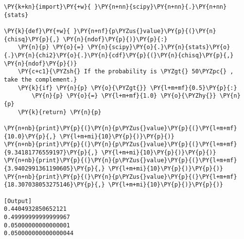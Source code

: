 \begin{Verbatim}[label=\makebox{\href{https://github.com/unipi-physics-labs/statnotes/tree/main/snippy/p_value.py}{https://github.com/.../p\_value.py}},commandchars=\\\{\}]
\PY{k+kn}{import}\PY{+w}{ }\PY{n+nn}{scipy}\PY{n+nn}{.}\PY{n+nn}{stats}

\PY{k}{def}\PY{+w}{ }\PY{n+nf}{p\PYZus{}value}\PY{p}{(}\PY{n}{chisq}\PY{p}{,} \PY{n}{ndof}\PY{p}{)}\PY{p}{:}
    \PY{n}{p} \PY{o}{=} \PY{n}{scipy}\PY{o}{.}\PY{n}{stats}\PY{o}{.}\PY{n}{chi2}\PY{o}{.}\PY{n}{cdf}\PY{p}{(}\PY{n}{chisq}\PY{p}{,} \PY{n}{ndof}\PY{p}{)}
    \PY{c+c1}{\PYZsh{} If the probability is \PYZgt{} 50\PYZpc{} , take the complement.}
    \PY{k}{if} \PY{n}{p} \PY{o}{\PYZgt{}} \PY{l+m+mf}{0.5}\PY{p}{:}
        \PY{n}{p} \PY{o}{=} \PY{l+m+mf}{1.0} \PY{o}{\PYZhy{}} \PY{n}{p}
    \PY{k}{return} \PY{n}{p}

\PY{n+nb}{print}\PY{p}{(}\PY{n}{p\PYZus{}value}\PY{p}{(}\PY{l+m+mf}{10.0}\PY{p}{,} \PY{l+m+mi}{10}\PY{p}{)}\PY{p}{)}
\PY{n+nb}{print}\PY{p}{(}\PY{n}{p\PYZus{}value}\PY{p}{(}\PY{l+m+mf}{9.34181776559197}\PY{p}{,} \PY{l+m+mi}{10}\PY{p}{)}\PY{p}{)}
\PY{n+nb}{print}\PY{p}{(}\PY{n}{p\PYZus{}value}\PY{p}{(}\PY{l+m+mf}{3.9402991361190605}\PY{p}{,} \PY{l+m+mi}{10}\PY{p}{)}\PY{p}{)}
\PY{n+nb}{print}\PY{p}{(}\PY{n}{p\PYZus{}value}\PY{p}{(}\PY{l+m+mf}{18.307038053275146}\PY{p}{,} \PY{l+m+mi}{10}\PY{p}{)}\PY{p}{)}

[Output]
0.4404932850652121
0.49999999999999967
0.05000000000000001
0.050000000000000044
\end{Verbatim}
